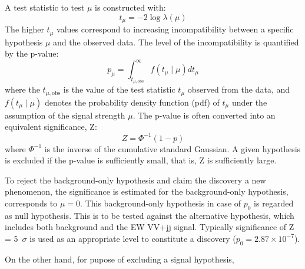 A test statistic to test $\mu$ is constructed with:
\begin{equation}
t_{\mu}= -2 \log \lambda (\mu)
\end{equation}
The higher $t_{\mu}$ values correspond to increasing incompatibility between a specific hypothesis $\mu$ and the observed data.
The level of the incompatibility is quantified by the p-value:
\begin{equation}
p_{\mu}=\int_{t_{\mu, \mathrm{obs}}}^{\infty} f\left(t_{\mu} \mid \mu\right) d t_{\mu}
\end{equation}
where the $t_{\mu, \mathrm{obs}}$ is the value of the test statistic $t_{\mu}$ observed from the data, and $f\left(t_{\mu} \mid \mu\right)$ denotes the probability density function (pdf) of $t_{\mu}$ under the assumption of the signal strength $\mu$.
%
The p-value is often converted into an equivalent significance, Z:
\begin{equation}
Z=\Phi^{-1}(1-p)
\end{equation}
where $\Phi^{-1}$ is the inverse of the cumulative standard Gaussian.
A given hypothesis is excluded if the p-value is sufficiently small, that is, Z is sufficiently large.

To reject the background-only hypothesis and claim the discovery a new phenomenon, the significance is estimated for the background-only hypothesis, corresponds to $\mu = 0$.
This background-only hypothesis in case of $p_0$ is regarded as null hypothesis. 
This is to be tested against the alternative hypothesis, which includes both background and the EW VV+jj signal.
Typically significance of Z = 5~$\sigma$ is used as an appropriate level to constitute a discovery ($p_0 = 2.87 \times 10^{-7}$). 

On the other hand, for pupose of excluding a signal hypothesis, 


